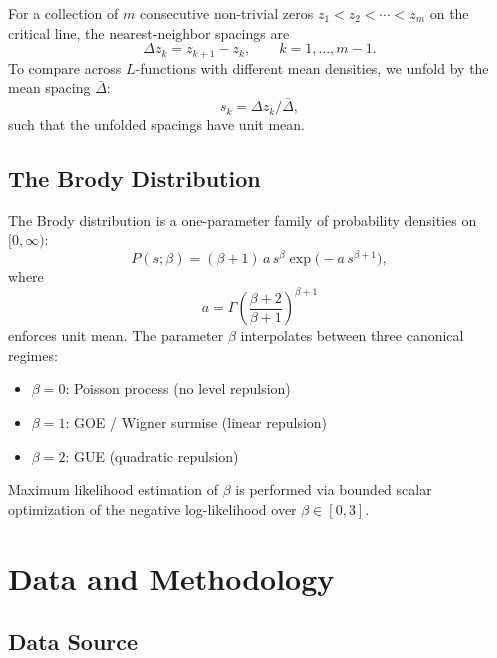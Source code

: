 \documentclass[11pt]{article}
\begin{document}
For a collection of $m$ consecutive non-trivial zeros
$z_1 < z_2 < \cdots < z_m$ on the critical line, the nearest-neighbor
spacings are
\begin{equation}
\Delta z_k = z_{k+1} - z_k, \qquad k = 1,\ldots,m-1.
\end{equation}
To compare across $L$-functions with different mean densities, we
unfold by the mean spacing $\bar{\Delta}$:
\begin{equation}
s_k = \Delta z_k / \bar{\Delta},
\end{equation}
such that the unfolded spacings have unit mean.

\subsection{The Brody Distribution}

The Brody distribution \cite{brody1973} is a one-parameter family of
probability densities on $[0,\infty)$:
\begin{equation}
P(s;\beta) = (\beta+1)\, a\, s^{\beta} \exp\!\bigl(-a\, s^{\beta+1}\bigr),
\label{eq:brody}
\end{equation}
where
\begin{equation}
a = \Gamma\!\left(\frac{\beta+2}{\beta+1}\right)^{\beta+1}
\end{equation}
enforces unit mean.  The parameter $\beta$ interpolates between
three canonical regimes:
\begin{itemize}
  \item $\beta = 0$: Poisson process (no level repulsion)
  \item $\beta = 1$: GOE / Wigner surmise (linear repulsion)
  \item $\beta = 2$: GUE (quadratic repulsion)
\end{itemize}
Maximum likelihood estimation of $\beta$ is performed via bounded
scalar optimization of the negative log-likelihood over $\beta\in[0,3]$.

\section{Data and Methodology}
\label{sec:method}

\subsection{Data Source}
\end{document}
